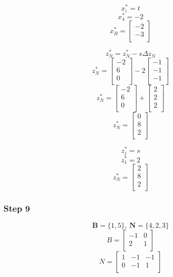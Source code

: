 \documentclass[14pt]{extarticle}
\begin{document}
\[
    x^*_i = t
\]
\[
    x^*_4 = -2
\]
\[
    x^*_B = \begin{bmatrix}
        -2 \\
        -3 \\
    \end{bmatrix}
\]

\[
    z^*_N = z^*_N - s \Delta z_N
\]
\[
    z^*_N = \begin{bmatrix}
        -2 \\
        6 \\
        0 \\
    \end{bmatrix}
    - 2 \begin{bmatrix}
        -1 \\
        -1 \\
        -1 \\
    \end{bmatrix}
\]
\[
    z^*_N = \begin{bmatrix}
        -2 \\
        6 \\
        0 \\
    \end{bmatrix}
    + \begin{bmatrix}
        2 \\
        2 \\
        2 \\
    \end{bmatrix}
\]
\[
    z^*_N = \begin{bmatrix}
        0 \\
        8 \\
        2 \\
    \end{bmatrix}
\]

\[
    z^*_j = s
\]
\[
    z^*_1 = 2
\]
\[
    z^*_N = \begin{bmatrix}
        2 \\
        8 \\
        2 \\
    \end{bmatrix}
\]

\subsubsection*{Step 9}
\[
    \boldsymbol{B} = \{1, 5\},\ \boldsymbol{N} = \{4, 2, 3\}
\]
\[
    B = \begin{bmatrix}
        -1 & 0 \\
        2 & 1 \\
    \end{bmatrix}
\]
\[
    N = \begin{bmatrix}
        1 & -1 & -1 \\
        0 & -1 & 1 \\
    \end{bmatrix}
\]
\end{document}
